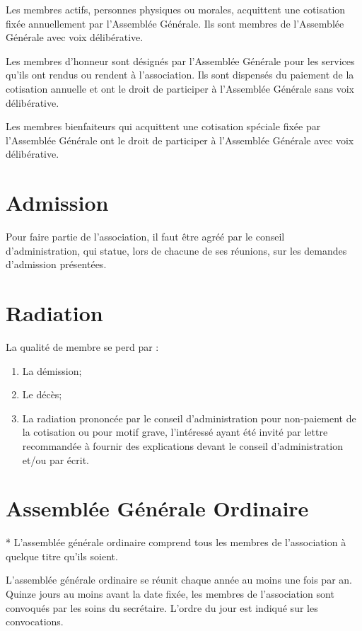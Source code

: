 \documentclass[12pt]{constitution}
\begin{document}
\medskip
Les membres actifs, personnes physiques ou morales, acquittent une cotisation fixée annuellement par l'Assemblée Générale. Ils sont membres de l'Assemblée Générale avec voix délibérative.

\medskip
Les membres d'honneur sont désignés par l'Assemblée Générale pour les services qu'ils ont rendus ou rendent à l'association. Ils sont dispensés du paiement de la cotisation annuelle et ont le droit de participer à l'Assemblée Générale sans voix délibérative.

\medskip
Les membres bienfaiteurs qui acquittent une cotisation spéciale fixée par l'Assemblée Générale ont le droit de participer à l'Assemblée Générale avec voix délibérative.

\section{Admission}
Pour faire partie de l'association, il faut être agréé par le conseil d’administration, qui statue, lors de chacune de ses réunions, sur les demandes d'admission présentées.

\section{Radiation}
La qualité de membre se perd par :
\begin{enumerate}
	\item La démission;
	\item Le décès;
	\item La radiation prononcée par le conseil d'administration pour non-paiement de la cotisation ou pour motif grave, l'intéressé ayant été invité par lettre recommandée à fournir des explications devant le conseil d'administration et/ou par écrit. 
\end{enumerate}

\setcounter{section}{7}

\section{Assemblée Générale Ordinaire}*
\label{AGO}
L'assemblée générale ordinaire comprend tous les membres de l'association à quelque titre qu'ils soient.

\medskip
L’assemblée générale ordinaire se réunit chaque année au moins une fois par an. Quinze jours au moins avant la date fixée, les membres de l’association sont convoqués par les soins du secrétaire. L’ordre du jour est indiqué sur les convocations.
\end{document}
